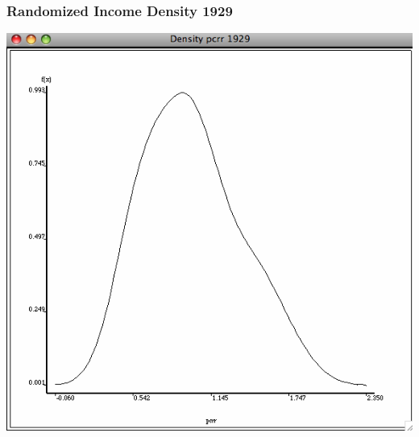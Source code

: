 \documentclass[nototal]{beamer}
\begin{document}
\begin{frame}
	\frametitle{Randomized Income Density 1929}
 \begin{center}
 \includegraphics[width=.65\linewidth]{density29random.png}
  \end{center}
 \end{frame} 
\end{document}
